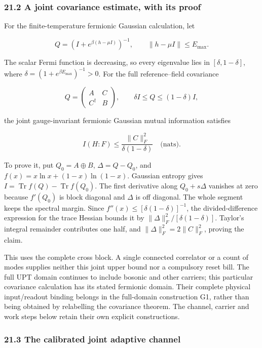\documentclass[
]{article}
\begin{document}
\subsubsection{21.2 A joint covariance estimate, with its
proof}\label{a-joint-covariance-estimate-with-its-proof}

For the finite-temperature fermionic Gaussian calculation, let

\[
Q=(I+e^{\beta(h-\mu I)})^{-1},\qquad
\|h-\mu I\|\le E_{\max}.
\]

The scalar Fermi function is decreasing, so every eigenvalue lies in
\([\delta,1-\delta]\), where \(\delta=(1+e^{\beta E_{\max}})^{-1}>0\).
For the full reference--field covariance

\[
Q=\begin{pmatrix}A&C\\C^\dagger&B\end{pmatrix},
\qquad \delta I\le Q\le(1-\delta)I,
\]

the joint gauge-invariant fermionic Gaussian mutual information
satisfies

\[
I(H:F)\le\frac{\|C\|_F^2}{\delta(1-\delta)}
\quad\text{(nats)}.
\]

To prove it, put \(Q_0=A\oplus B\), \(\Delta=Q-Q_0\), and
\(f(x)=x\ln x+(1-x)\ln(1-x)\). Gaussian entropy gives
\(I=\operatorname{Tr}f(Q)-\operatorname{Tr}f(Q_0)\). The first
derivative along \(Q_0+s\Delta\) vanishes at zero because \(f'(Q_0)\) is
block diagonal and \(\Delta\) is off diagonal. The whole segment keeps
the spectral margin. Since \(f''(x)\le[\delta(1-\delta)]^{-1}\), the
divided-difference expression for the trace Hessian bounds it by
\(\|\Delta\|_F^2/[\delta(1-\delta)]\). Taylor's integral remainder
contributes one half, and \(\|\Delta\|_F^2=2\|C\|_F^2\), proving the
claim.

This uses the complete cross block. A single connected correlator or a
count of modes supplies neither this joint upper bound nor a compulsory
reset bill. The full UPT domain continues to include bosonic and other
carriers; this particular covariance calculation has its stated
fermionic domain. Their complete physical input/readout binding belongs
in the full-domain construction G1, rather than being obtained by
relabelling the covariance theorem. The channel, carrier and work steps
below retain their own explicit constructions.

\subsubsection{21.3 The calibrated joint adaptive
channel}\label{the-calibrated-joint-adaptive-channel}
\end{document}
